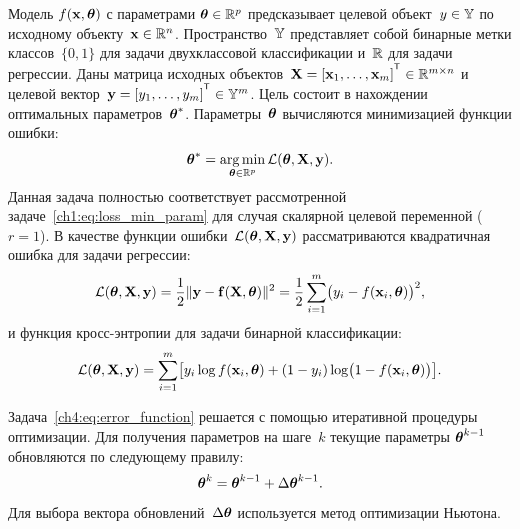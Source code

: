 Модель $f( \mathbf{x}, \boldsymbol{\theta})$ с параметрами $\boldsymbol{\theta} \in \mathbb{R}^p$ предсказывает целевой объект~$y \in \mathbb{Y}$ по исходному объекту~$\mathbf{x} \in \mathbb{R}^{n}$. Пространство~$\mathbb{Y}$ представляет собой бинарные метки классов~$\{0, 1\}$ для задачи двухклассовой классификации и~$\mathbb{R}$ для задачи регрессии.
Даны матрица исходных объектов~$\bX = [\bx_1, \dots, \bx_m]^{\T} \in \bbR^{m \times n}$ и целевой вектор~$\by = [y_1, \dots, y_m]^{\T} \in \bbY^{m}$. 
Цель состоит в нахождении оптимальных параметров~$\boldsymbol{\theta}^*$.
Параметры~$\boldsymbol{\theta}$ вычисляются минимизацией функции ошибки:
\begin{equation}
	\boldsymbol{\theta}^* = \mathop{\arg \min}\limits_{\boldsymbol{\theta} \in \mathbb{R}^p} \mathcal{L}(\boldsymbol{\theta}, \mathbf{X}, \mathbf{y}).
	\label{ch4:eq:error_function}
\end{equation}
Данная задача полностью соответствует рассмотренной задаче~\eqref{ch1:eq:loss_min_param} для случая скалярной целевой переменной ($r=1$).
В качестве функции ошибки~$\mathcal{L} (\boldsymbol{\theta}, \mathbf{X}, \mathbf{y})$ рассматриваются квадратичная ошибка для задачи регрессии:
\begin{equation}
	\mathcal{L}(\boldsymbol{\theta}, \mathbf{X}, \mathbf{y}) = \frac 12 \| \mathbf{y} - \mathbf{f}(\mathbf{X}, \boldsymbol{\theta}) \|^2 = \frac 12 \sum_{i=1}^m \bigl( y_i - f(\mathbf{x}_i,  \boldsymbol{\theta})\bigr)^2,
	\label{ch4:eq:squared_error}
\end{equation}
и функция кросс-энтропии для задачи бинарной классификации: 
\begin{equation}
	\mathcal{L}(\boldsymbol{\theta}, \mathbf{X}, \mathbf{y}) = \sum_{i=1}^m \bigl[y_i \log f (\mathbf{x}_i , \boldsymbol{\theta}) + (1-y_i) \log \bigl(1 - f (\mathbf{x}_i , \boldsymbol{\theta})\bigr)\bigr].
	\label{ch4:eq:log_loss}
\end{equation}

Задача~\eqref{ch4:eq:error_function} решается с помощью итеративной процедуры оптимизации. 
Для получения параметров на шаге~$k$ текущие параметры $\boldsymbol{\theta}^{k-1}$ обновляются по следующему правилу:
\begin{equation}
	\boldsymbol{\theta}^k = \boldsymbol{\theta}^{k - 1} + \Delta \boldsymbol{\theta}^{k - 1}.
	\label{ch4:eq:update_rule}
\end{equation}
Для выбора вектора обновлений~$\Delta \boldsymbol{\theta}$ используется метод оптимизации Ньютона.

